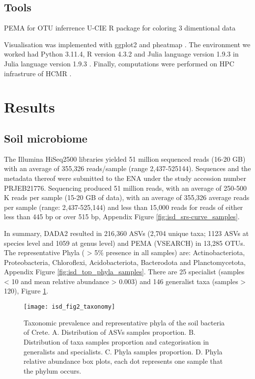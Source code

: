 \subsection{Tools}\label{Coding environment}
PEMA for OTU inferrence \parencite{zafeiropoulos2020pema}
U-CIE R package for coloring 3 dimentional data \parencite{Koutrouli2022}

Visualisation was implemented with ggplot2 \parencite{wickham_ggplot2_2016} and pheatmap \parencite{Kolde2019}.
The environment we worked had Python 3.11.4, R version 4.3.2 \parencite{rcoreteam}
and Julia language version 1.9.3 \parencite{Julia-2017}in Julia language version 1.9.3 \parencite{Julia-2017}.
Finally, computations were performed on HPC infrastrure of HCMR \parencite{zafeiropoulos_0s_2021}.

\section{Results}\label{results}

\subsection{Soil microbiome}\label{soil_microbiome}

The Illumina HiSeq2500 libraries yielded 51 million sequenced reads (16-20 GB) with
an average of 355,326 reads/sample (range 2,437-525144). Sequences and the
metadata thereof were submitted to the ENA under the study accession number PRJEB21776.
Sequencing produced 51 million reads, with an average of 250-500 K reads per
sample (15-20 GB of data), with an average of 355,326 average reads per sample
(range: 2,437-525,144) and less than 15,000 reads for reads of either less than
445 bp or over 515 bp, Appendix Figure \ref{fig:isd_srs-curve_samples}.

In summary, DADA2 resulted in 216,360 ASVs (2,704 unique
taxa; 1123 ASVs at species level and 1059 at genus level) and
PEMA (VSEARCH) in 13,285 OTUs.
The representative Phyla ( > 5\% presence in all samples) are:
Actinobacteriota, Proteobacteria, Chloroflexi, Acidobacteriota,
Bacterodota and Planctomycetota, Appendix Figure \ref{fig:isd_top_phyla_samples}.
There are 25 specialist (samples < 10 and mean relative
abundance > 0.003) and 146 generalist taxa (samples > 120), Figure \ref{fig:isd_fig2_taxonomy}.

\begin{figure}[t] 
    \centering\texttt{[image: isd\_fig2\_taxonomy]}
    \caption{Taxonomic prevalence and representative phyla of the soil bacteria of Crete. 
    A. Distribution of ASVs samples proportion. B. Distribution of taxa samples
proportion and categorisation in generalists and specialists. C. Phyla samples proportion.
D. Phyla relative abundance box plots, each dot represents one sample that the phylum occurs.}
    \label{fig:isd_fig2_taxonomy}
\end{figure}

